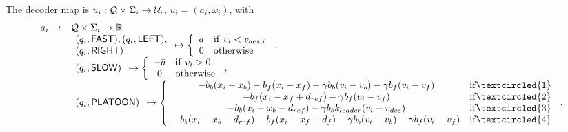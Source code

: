 The decoder map is $u_i :  \mathcal{Q} \times \Sigma_i \rightarrow \mathcal{U}_i$, $u_i = (a_i, \omega_i)$, with
\begin{equation*}
\begin{array}{rcl}
a_i  & : & \Q \times \Sigma_i \rightarrow \real \\
& & \begin{array}{l} (q_i, \mfast), (q_i, \mleft), \\ (q_i, \mright) \end{array}
\mapsto 
\left \lbrace
\begin{array}{cl}
\bar{a} & \mathrm{if} \ v_i < v_{des, i} \\
0 & \mathrm{otherwise}
\end{array}
\right. \, ,
\\
& & \begin{array}{l} (q_i, \mslow) \end{array} 
\mapsto 
\left \lbrace
\begin{array}{cl}
-\bar{a} & \mathrm{if} \ v_i > 0 \\
0 & \mathrm{otherwise}
\end{array}
\right. \, , \\
& & \begin{array}{l} (q_i, \mplatoon) \end{array} 
\mapsto 
\left \lbrace
\begin{array}{cl}
-b_b(x_i - x_{b}) - b_f(x_i - x_f) - \gamma b_b (v_i - v_b) - \gamma b_f (v_i - v_f) & \mathrm{if} \textcircled{1}\\
-b_f(x_i - x_{f} + d_{ref}) - \gamma b_f(v_i - v_f) & \mathrm{if} \textcircled{2} \\
-b_b(x_i - x_{b} - d_{ref}) - \gamma b_b k_{leader} (v_i - v_{des}) & \mathrm{if} \textcircled{3} \\
-b_b(x_i - x_{b} - d_{ref}) - b_f(x_i - x_f + d_f) - \gamma b_b (v_i - v_b) - \gamma b_f (v_i - v_f) & \mathrm{if} \textcircled{4} \\
 \end{array}
\right. \, ,
\end{array}
\end{equation*}
